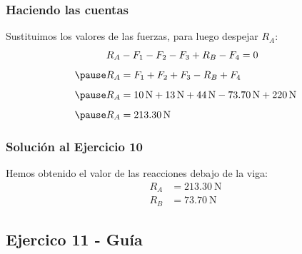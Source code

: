 \documentclass[12pt]{beamer}
\begin{document}
\begin{frame}
\frametitle{Haciendo las cuentas}
Sustituimos los valores de las fuerzas, para luego despejar $R_{A}$:
\pause
\begin{eqnarray*}
\begin{aligned}
&R_{A} - F_{1} - F_{2} - F_{3} + R_{B} - F_{4} = 0 \\[0.5em] \pause
&R_{A} = F_{1} + F_{2} + F_{3} - R_{B} + F_{4} \\[0.5em] \pause
&R_{A} = \SI{10}{\newton} + \SI{13}{\newton} + \SI{44}{\newton} - \SI{73.70}{\newton} + \SI{220}{\newton} \\[0.5em] \pause
&R_{A} = \SI{213.30}{\newton}
\end{aligned}
\end{eqnarray*}
\end{frame}
\begin{frame}
\frametitle{Solución al Ejercicio 10}
Hemos obtenido el valor de las reacciones debajo de la viga:
\begin{align*}
R_{A} &= \SI{213.30}{\newton} \\[0.5em]
R_{B} &= \SI{73.70}{\newton}
\end{align*}
\end{frame}

\subsection{Ejercico 11 - Guía}
\end{document}
